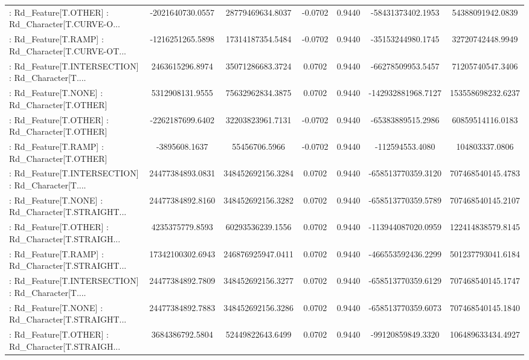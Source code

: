 \begin{longtable}{p{4cm}cccccc}
 : Rd\_Feature[T.OTHER] : Rd\_Character[T.CURVE-O... &  -2021640730.0557 &  28779469634.8037 & -0.0702 &       0.9440 &  -58431373402.1953 &  54388091942.0839 \\
 : Rd\_Feature[T.RAMP] : Rd\_Character[T.CURVE-OT... &  -1216251265.5898 &  17314187354.5484 & -0.0702 &       0.9440 &  -35153244980.1745 &  32720742448.9949 \\
 : Rd\_Feature[T.INTERSECTION] : Rd\_Character[T.... &   2463615296.8974 &  35071286683.3724 &  0.0702 &       0.9440 &  -66278509953.5457 &  71205740547.3406 \\
 : Rd\_Feature[T.NONE] : Rd\_Character[T.OTHER]      &   5312908131.9555 &  75632962834.3875 &  0.0702 &       0.9440 & -142932881968.7127 & 153558698232.6237 \\
 : Rd\_Feature[T.OTHER] : Rd\_Character[T.OTHER]     &  -2262187699.6402 &  32203823961.7131 & -0.0702 &       0.9440 &  -65383889515.2986 &  60859514116.0183 \\
 : Rd\_Feature[T.RAMP] : Rd\_Character[T.OTHER]      &     -3895608.1637 &     55456706.5966 & -0.0702 &       0.9440 &    -112594553.4080 &    104803337.0806 \\
 : Rd\_Feature[T.INTERSECTION] : Rd\_Character[T.... &  24477384893.0831 & 348452692156.3284 &  0.0702 &       0.9440 & -658513770359.3120 & 707468540145.4783 \\
 : Rd\_Feature[T.NONE] : Rd\_Character[T.STRAIGHT... &  24477384892.8160 & 348452692156.3282 &  0.0702 &       0.9440 & -658513770359.5789 & 707468540145.2107 \\
 : Rd\_Feature[T.OTHER] : Rd\_Character[T.STRAIGH... &   4235375779.8593 &  60293536239.1556 &  0.0702 &       0.9440 & -113944087020.0959 & 122414838579.8145 \\
 : Rd\_Feature[T.RAMP] : Rd\_Character[T.STRAIGHT... &  17342100302.6943 & 246876925947.0411 &  0.0702 &       0.9440 & -466553592436.2299 & 501237793041.6184 \\
 : Rd\_Feature[T.INTERSECTION] : Rd\_Character[T.... &  24477384892.7809 & 348452692156.3277 &  0.0702 &       0.9440 & -658513770359.6129 & 707468540145.1747 \\
 : Rd\_Feature[T.NONE] : Rd\_Character[T.STRAIGHT... &  24477384892.7883 & 348452692156.3286 &  0.0702 &       0.9440 & -658513770359.6073 & 707468540145.1840 \\
 : Rd\_Feature[T.OTHER] : Rd\_Character[T.STRAIGH... &   3684386792.5804 &  52449822643.6499 &  0.0702 &       0.9440 &  -99120859849.3320 & 106489633434.4927 \\

\end{longtable}
